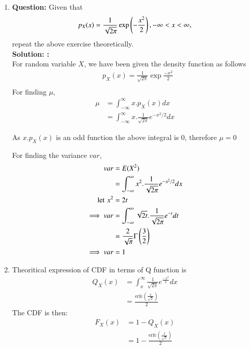 \documentclass[journal,12pt,twocolumn]{IEEEtran}
\begin{document}
\begin{enumerate}[label=\thesection.\arabic*
,ref=\thesection.\theenumi]
\item\textbf{Question: }Given that\\ 
\begin{align}
p_{X}(x) = \frac{1}{\sqrt{2\pi}}\exp\left(-\frac{x^2}{2}\right), -\infty < x < \infty,
\end{align}
repeat the above exercise theoretically.\\
\noindent \textbf{Solution: :}\\
For random variable $X$, we have been given the density function as follows
    \begin{align}
        &p_X(x) = \frac{1}{\sqrt{2\pi}}\exp{\frac{-x^2}{2}}\\
    \end{align}
For finding $\mu$,
\begin{align}
    \mu &= \int _ {- \infty} ^ {\infty} {x . p_X(x) dx} \\
    &= \int _ {- \infty} ^ {\infty} {x . \frac{1}{\sqrt{2 \pi}} e^{-x^2 / 2} dx}
\end{align}

As $x . p_X(x)$ is an odd function the above integral is $0$, therefore $\mu = 0$

For finding the variance $var$,
\begin{align}
    var &= E(X^2) \\
    &= \int _ {- \infty} ^ {\infty} {x^2 . \frac{1}{\sqrt{2 \pi}} e^{-x^2 / 2} dx} \\
    \text{let\,\,} x^2 &= 2t \\
    \implies var &= \int _ {- \infty} ^ {\infty} {\sqrt{2t} . \frac{1}{\sqrt{2\pi}} e^{-t} dt} \\
    &= \frac{2}{\sqrt{\pi}} \Gamma \left(\frac{3}{2}\right) \\
    \implies var &= 1
\end{align}
\item Theoritical expression of CDF in terms of Q function is \\
    \begin{align}
    Q_X(x) &= \int_x ^{\infty} \frac{1}{\sqrt{2\pi}} e^{\frac{-x^2}{2}} dx \\
      &= \frac{\text{erfc}(\frac{x}{\sqrt{2}})}{2}
   \end{align}
The CDF is then:
\begin{align}
    F_X(x) &= 1 - Q_X(x) \\
    &= 1 - \frac{\text{erfc}(\frac{x}{\sqrt{2}})}{2}
\end{align}
\end{enumerate}
\end{document}
